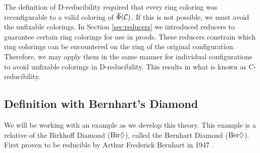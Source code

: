 The definition of D-reducibility required that every ring coloring was reconfigurable to a valid coloring of $\overline{\Phi}(\mathcal{C})$. If this is not possible, we must avoid the unfixable colorings. In Section \ref{sec:reducers} we introduced reducers to guarantee certain ring colorings for use in proofs. These reducers constrain which ring colorings can be encountered on the ring of the original configuration. Therefore, we may apply them in the same manner for individual configurations to avoid unfixable colorings in D-reducibility. This results in what is known as C-reducibility.

\subsection{Definition with Bernhart's Diamond}

We will be working with an example as we develop this theory. This example is a relative of the Birkhoff Diamond ($
\text{Bir}\Diamond$), called the Bernhart Diamond ($\text{Ber}\Diamond$). First proven to be reducible by Arthur Frederick Bernhart in 1947 \cite{bernhart}.

